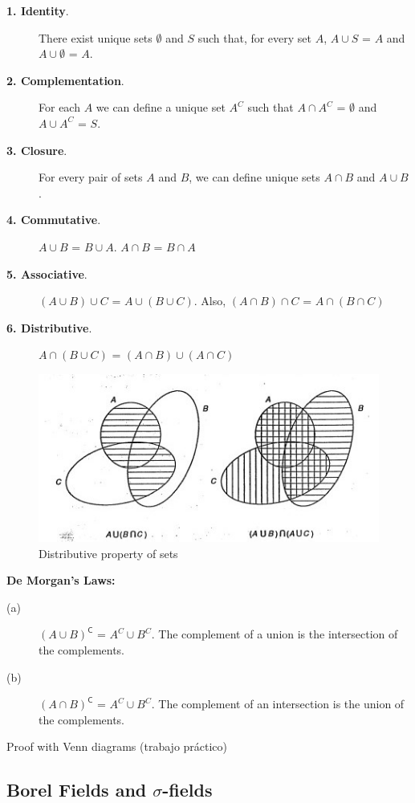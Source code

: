 \documentclass{article}
\begin{document}
\begin{description}
    \item[\textbf{1. Identity}.] There exist unique sets $\emptyset$ and \(S\) such that, for every set \(A\), \(A\cup S\) = \(A\) and \(A\cup \emptyset\) = \(A\). 
    \item[\textbf{2. Complementation}.] For each \(A\) we can define a unique set \(A^C\) such that \(A\cap A^C\) = $\emptyset$ and \(A\cup A^C\) = \(S\). 
    \item[\textbf{3. Closure}.] For every pair of sets \(A\) and \(B\), we can define unique sets \(A\cap B\) and \(A \cup B\). 
    \item[\textbf{4. Commutative}.] \(A \cup B\) = \(B \cup A\). \(A \cap B\) = \(B \cap A\)
    \item[\textbf{5. Associative}.] \((A \cup B)\cup C\) = \(A \cup (B\cup C)\). Also, \((A \cap B)\cap C\) = \(A \cap (B\cap C)\)
    \item[\textbf{6. Distributive}.] \(A \cap (B\cup C)\) = \((A \cap B)\cup(A \cap C)\)
\end{description}
\begin{figure}[h]
    \centering
    \includegraphics{pics/distributive .jpg}
    \caption{Distributive property of sets}
\end{figure}


\textbf{De Morgan's Laws:}
\begin{description}
   \item[(a)] \( (A \cup B)^\mathsf{C} \) = \(A^C \cup B^C\). The complement of a union is the intersection of the complements.
   \item[(b)] \((A \cap B)^\mathsf{C} \) = \(A^C \cup B^C\). The complement of an intersection is the union of the complements.
\end{description}
Proof with Venn diagrams (trabajo práctico)

\subsection{Borel Fields and $\sigma$-fields}
\end{document}
